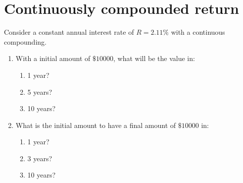 \section{Continuously compounded return}
Consider a constant annual interest rate of $R = 2.11\%$ with a continuous compounding. 
\begin{enumerate}
    \item With a initial amount of $\$10000 $, what will be the value in:
    \begin{enumerate}
        \item 1 year?
        \item 5 years?
        \item 10 years?
    \end{enumerate}
    \item What is the initial amount to have a final amount of $\$10000$ in:
    \begin{enumerate}
        \item 1 year?
        \item 3 years?
        \item 10 years?
    \end{enumerate}
\end{enumerate}